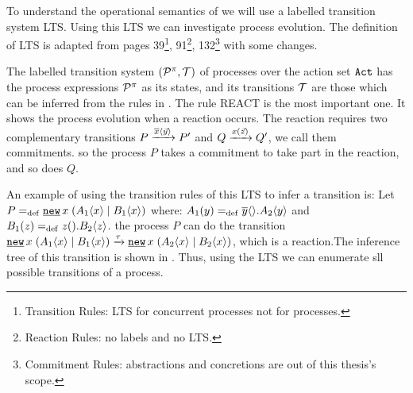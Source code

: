 To understand the operational semantics of \picalc{} we will use  a labelled transition system LTS. Using this LTS we can investigate \picalc{} process evolution. The definition of LTS is adapted from \cite{milner} pages 39\footnote{Transition Rules: LTS for concurrent processes not for \picalc{} processes.}, 91\footnote{Reaction Rules: no labels and no LTS.}, 132\footnote{Commitment Rules: abstractions and concretions are out of this thesis's scope.} with some changes.

\begin{definition}
\label{def_trans_system}

The labelled transition system $(\procs,\traces)$ of \picalc{} processes over the action set $\mathtt{Act}$ has the process expressions $\mathcal P^{\pi}$ as its states, and its transitions $\traces$ are those which can be inferred from the rules in .
The rule REACT is the most important one. It shows the process evolution when a reaction occurs. The reaction requires two complementary transitions $P \xrightarrow{\overline{x}\langle\vec{y}\rangle} P'$ and $Q \xrightarrow{x(\vec{z})} Q'$, we call them commitments. so the process $P$ takes a commitment to take part in the reaction, and so does $Q$.

\end{definition}


An example of using the transition rules of this LTS to infer a transition is: Let $P\define\procres{x}{(\procpar{\proccall{A_1}{x}}{\proccall{B_1}{x}})}$ where: $A_1(y)=_{\mathrm{def}}{}\overline{y}\langle{}\rangle.A_2\langle y\rangle$ and $B_1(z)=_{\mathrm{def}}{}z({}).B_2\langle z\rangle$. the process $P$ can do the transition $\procres{x}{(\procpar{\proccall{A_1}{x}}{\proccall{B_1}{x}})} \transs{\tau} \procres{x}{(\procpar{\proccall{A_2}{x}}{\proccall{B_2}{x}})}$, which is a reaction.The inference tree of this transition is shown in . Thus, using the LTS we can enumerate sll possible transitions of a \picalc{} process.



